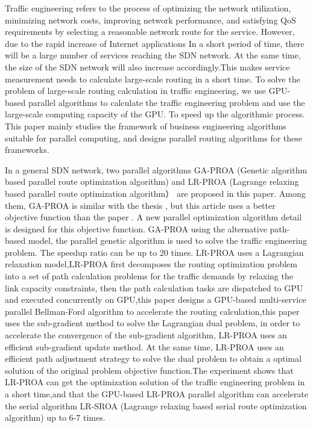 \documentclass[master]{thesis-uestc}
\begin{document}
\begin{englishabstract}

Traffic engineering refers to the process of optimizing the network utilization, minimizing network costs, improving network performance, and satisfying QoS requirements by selecting a reasonable network route for the service. However, due to the rapid increase of Internet applications In a short period of time, there will be a large number of services reaching the SDN network. At the same time, the size of the SDN network will also increase accordingly.This makes service measurement needs to calculate large-scale routing in a short time. To solve the problem of large-scale routing calculation in traffic engineering, we use GPU-based parallel algorithms to calculate the traffic engineering problem and use the large-scale computing capacity of the GPU. To speed up the algorithmic process. This paper mainly studies the framework of business engineering algorithms suitable for parallel computing, and designs parallel routing algorithms for these frameworks.

In a general SDN network, two parallel algorithms GA-PROA (Genetic algorithm based parallel route optimization algorithm) and LR-PROA (Lagrange relaxing based parallel route optimization algorithm） are proposed in this paper. Among them, GA-PROA is similar with the thesis , but this article uses a better objective function than the paper . A new parallel optimization algorithm detail is designed for this objective function. GA-PROA using the alternative path-based model, the parallel genetic algorithm is used to solve the traffic engineering problem. The speedup ratio can be up to 20 times. LR-PROA uses a Lagrangian relaxation model,LR-PROA first decomposes the routing optimization problem into a set of path calculation problems for the traffic demands by relaxing the link capacity constraints, then the path calculation tasks are dispatched to GPU and executed concurrently on GPU,this paper designs a GPU-based multi-service parallel Bellman-Ford algorithm to accelerate the routing calculation,this paper uses the sub-gradient method to solve the Lagrangian dual problem, in order to accelerate the convergence of the sub-gradient algorithm, LR-PROA uses an efficient sub-gradient update method. At the same time, LR-PROA uses an efficient path adjustment strategy to solve the dual problem to obtain a optimal solution of the original problem objective function.The experiment shows that LR-PROA can get the optimization solution of the traffic engineering problem in a short time,and that the GPU-based LR-PROA parallel algorithm can accelerate the serial algorithm LR-SROA (Lagrange relaxing based serial route optimization algorithm) up to 6-7 times.


\end{englishabstract}
\end{document}
